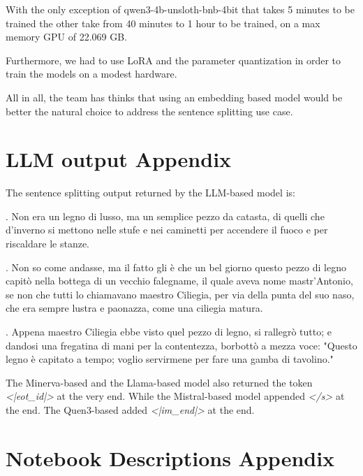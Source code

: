 \documentclass[11pt]{article}
\begin{document}
With the only exception of qwen3-4b-unsloth-bnb-4bit that takes 5 minutes
to be trained the other take from 40 minutes to 1 hour to be trained,
on a max memory GPU of 22.069 GB.

Furthermore,
we had to use LoRA and the parameter quantization in order to train the models
on a modest hardware.

All in all, the team has thinks that using an embedding based model
would be better the natural choice to address the sentence splitting use case.

\appendix

\section{LLM output Appendix}
\label{sec:appendix1}

The sentence splitting output returned by the LLM-based model is:

{\selectfont

\vspace{3mm}

. Non era un legno di lusso, ma un semplice pezzo da catasta, di quelli che d’inverno si mettono nelle stufe e nei caminetti per accendere il fuoco e per riscaldare le stanze.

. Non so come andasse, ma il fatto gli è che un bel giorno questo pezzo di legno capitò nella bottega di un vecchio falegname, il quale aveva nome mastr’Antonio, se non che tutti lo chiamavano maestro Ciliegia, per via della punta del suo naso, che era sempre lustra e paonazza, come una ciliegia matura.

. Appena maestro Ciliegia ebbe visto quel pezzo di legno, si rallegrò tutto; e dandosi una fregatina di mani per la contentezza, borbottò a mezza voce: "Questo legno è capitato a tempo; voglio servirmene per fare una gamba di tavolino."

\vspace{3mm}

}

The Minerva-based and the Llama-based model also returned the token \emph{<|eot\_id|>}
at the very end. While the Mistral-based model appended \emph{</s>} at the end.
The Quen3-based added \emph{<|im\_end|>} at the end.

\section{Notebook Descriptions Appendix}
\label{sec:appendix2}
\end{document}
